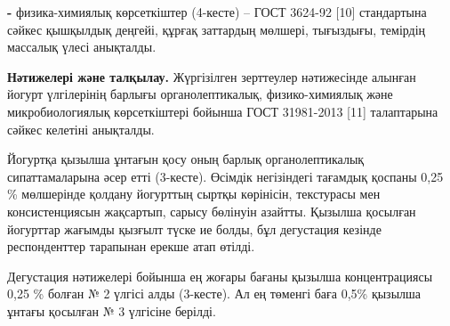 \begin{multicols}{2}
{\bfseries -} физика-химиялық көрсеткіштер (4-кесте) -- ГОСТ 3624-92
{[}10{]} стандартына сәйкес қышқылдық деңгейі, құрғақ заттардың мөлшері,
тығыздығы, темірдің массалық үлесі анықталды.

{\bfseries Нәтижелері және талқылау.} Жүргізілген зерттеулер нәтижесінде
алынған йогурт үлгілерінің барлығы органолептикалық, физико-химиялық
және микробиологиялық көрсеткіштері бойынша ГОСТ 31981-2013 {[}11{]}
талаптарына сәйкес келетіні анықталды.

Йогуртқа қызылша ұнтағын қосу оның барлық органолептикалық
сипаттамаларына әсер етті (3-кесте). Өсімдік негізіндегі тағамдық
қоспаны 0,25 \% мөлшерінде қолдану йогурттың сыртқы көрінісін,
текстурасы мен консистенциясын жақсартып, сарысу бөлінуін азайтты.
Қызылша қосылған йогурттар жағымды қызғылт түске ие болды, бұл
дегустация кезінде респонденттер тарапынан ерекше атап өтілді.

Дегустация нәтижелері бойынша ең жоғары бағаны қызылша концентрациясы
0,25 \% болған № 2 үлгісі алды (3-кесте). Ал ең төменгі баға 0,5\%
қызылша ұнтағы қосылған № 3 үлгісіне берілді.
\end{multicols}

